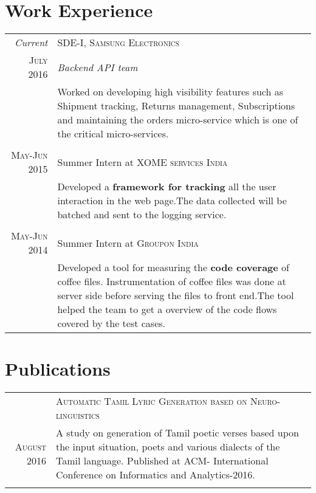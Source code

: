 \documentclass[a4paper,10pt]{article}
\begin{document}
\section{Work Experience}
\begin{tabular}{r|p{11cm}}
 \emph{Current} & SDE-I, \textsc{Samsung Electronics} \\\textsc{July 2016}&\emph{Backend API team}\\&\footnotesize{Worked on developing high visibility features such as Shipment tracking, Returns management, Subscriptions and maintaining the orders micro-service which is one of the critical micro-services. }\\\multicolumn{2}{c}{} \\
 \textsc{May-Jun 2015} & Summer Intern at \textsc{XOME services India}\\&\footnotesize{Developed a \textbf{framework for tracking} all the user interaction in the web page.The data collected will be batched and sent to the logging service. 
}\\\multicolumn{2}{c}{} \\
\textsc{May-Jun 2014} & Summer Intern at \textsc{Groupon India}\\&\footnotesize{Developed a tool for measuring the  \textbf{code coverage} of coffee files. Instrumentation of coffee files was done at server side before serving the files to front end.The tool helped the team to get a overview of the code flows covered by the test cases.
}
\end{tabular}


\section{Publications}
\begin{tabular}{r|p{11cm}}
  &  \textsc{Automatic Tamil Lyric Generation based on Neuro-linguistics} \\\textsc{August 2016}
  &\footnotesize{A study on generation of Tamil poetic verses based upon the input situation, poets and various dialects of
the Tamil language. Published at ACM- International Conference on Informatics and Analytics-2016.}\\\multicolumn{2}{c}{} \\
\end{tabular}

\end{document}
